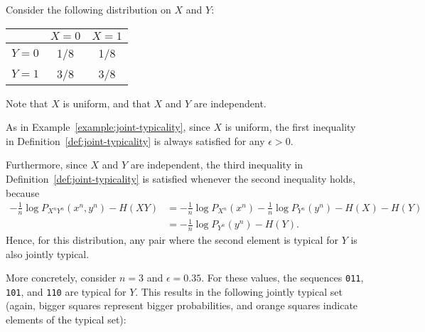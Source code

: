 \begin{example}\label{example:jointly-typical-2}
\newcommand{\mysquare}[4]{%
	\def\size{#2}
	\def\x{#4}
	\def\y{#3}
	\fill[#1] (\x-\size*0.5, 7-\y-\size*0.5) rectangle (\x+\size*0.5, 7-\y+\size*0.5);
}


Consider the following distribution on $X$ and $Y$:
\begin{center}
\begin{tabular}{c || c | c |}
&$X=0$&$X=1$\\
\hline
\hline
$Y=0$&1/8&1/8\\
$Y=1$&3/8&3/8\\
\end{tabular}
\end{center}
Note that $X$ is uniform, and that $X$ and $Y$ are independent.

As in Example~\ref{example:joint-typicality}, since $X$ is uniform, the first inequality in Definition~\ref{def:joint-typicality} is always satisfied for any $\epsilon > 0$.

Furthermore, since $X$ and $Y$ are independent, the third inequality in Definition~\ref{def:joint-typicality} is satisfied whenever the second inequality holds, because
\begin{align*}
-\frac{1}{n}\log P_{X^nY^n}(x^n,y^n) - H(XY) &= -\frac{1}{n}\log P_{X^n}(x^n) - \frac{1}{n}\log P_{Y^n}(y^n) - H(X) - H(Y)\\
&= -\frac{1}{n}\log P_{Y^n}(y^n) - H(Y).
\end{align*}
Hence, for this distribution, any pair where the second element is typical for $Y$ is also jointly typical.

More concretely, consider $n = 3$ and $\epsilon = 0.35$. For these values, the sequences \texttt{011}, \texttt{101}, and \texttt{110} are typical for $Y$. This results in the following jointly typical set (again, bigger squares represent bigger probabilities, and orange squares indicate elements of the typical set):

\begin{center}
\end{center}
\end{example}
